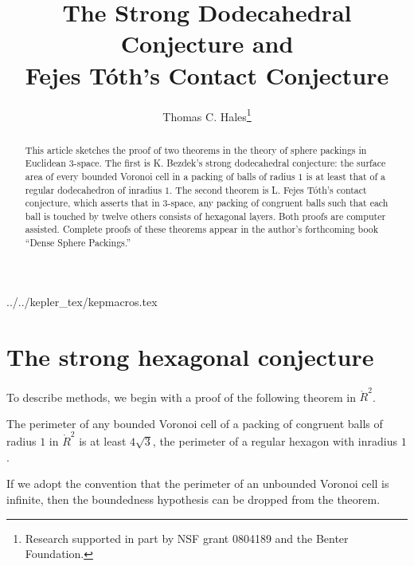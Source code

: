 \documentclass{llncs}
\begin{document}
\title{The Strong Dodecahedral Conjecture and\\ Fejes T\'oth's Contact Conjecture}
\author{Thomas C. Hales\thanks{{Research supported in part by 
NSF grant 0804189 and the Benter Foundation.}}}
\maketitle


\begin{abstract} This article sketches the proof of two theorems in
  the theory of sphere packings in Euclidean $3$-space.  The first is
  K. Bezdek's strong dodecahedral conjecture: the surface area of
  every bounded Voronoi cell in a packing of balls of radius $1$ is at least
  that of a regular dodecahedron of inradius $1$.  The second theorem
  is L. Fejes T\'oth's contact conjecture, which asserts that in
  $3$-space, any packing of congruent balls such that each ball is
  touched by twelve others consists of hexagonal layers.  Both proofs
  are computer assisted.  Complete proofs of these theorems
  appear in the author's forthcoming book ``Dense Sphere Packings.''
\end{abstract}

 {../../kepler_tex/kepmacros.tex}

\section{The strong hexagonal conjecture}

To describe methods, we begin with a  proof of the following theorem in $\ring{R}^2$.  

\begin{theorem}  The perimeter of any bounded Voronoi cell of a packing of congruent balls of radius $1$
in $\ring{R}^2$ is at least $4\sqrt{3}$, the perimeter of a regular hexagon with inradius $1$.
\end{theorem}

If we adopt the convention that the perimeter of an unbounded Voronoi cell is infinite, then
the boundedness hypothesis can be dropped from the theorem.
\end{document}
